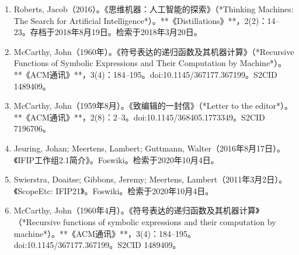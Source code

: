 \begin{enumerate}
\item Roberts, Jacob（2016）。《思维机器：人工智能的探索》（*Thinking Machines: The Search for Artificial Intelligence*）。**《Distillations》**，2(2)：14–23。存档于2018年8月19日。检索于2018年3月20日。
\item McCarthy, John（1960年）。《符号表达的递归函数及其机器计算》（*Recursive Functions of Symbolic Expressions and Their Computation by Machine*）。**《ACM通讯》**，3(4)：184–195。doi:10.1145/367177.367199。S2CID 1489409。
\item McCarthy, John（1959年8月）。《致编辑的一封信》（*Letter to the editor*）。**《ACM通讯》**，2(8)：2–3。doi:10.1145/368405.1773349。S2CID 7196706。
\item Jeuring, Johan; Meertens, Lambert; Guttmann, Walter（2016年8月17日）。《IFIP工作组2.1简介》。Foswiki。检索于2020年10月4日。
\item Swierstra, Doaitse; Gibbons, Jeremy; Meertens, Lambert（2011年3月2日）。《ScopeEtc: IFIP21》。Foswiki。检索于2020年10月4日。
\item McCarthy, John（1960年4月）。《符号表达的递归函数及其机器计算》（*Recursive functions of symbolic expressions and their computation by machine*）。**《ACM通讯》**，3(4)：184–195。doi:10.1145/367177.367199。S2CID 1489409。
\end{enumerate}